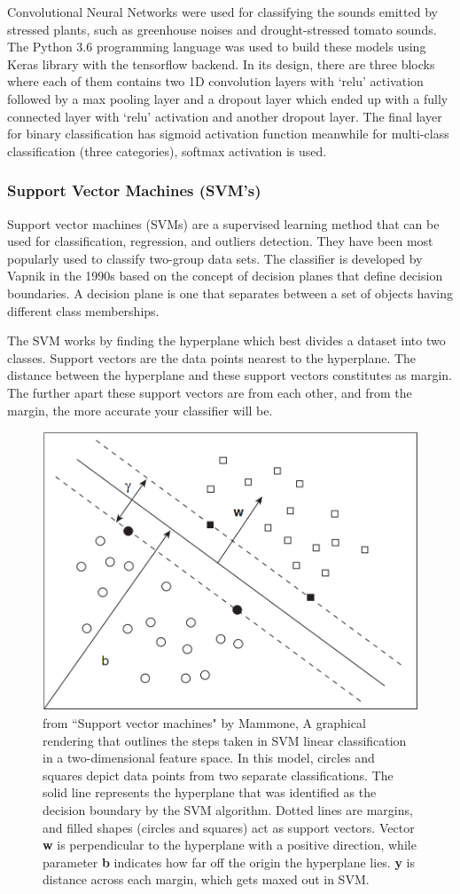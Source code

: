 Convolutional Neural Networks were used for classifying the sounds emitted by stressed plants, such as greenhouse noises and drought-stressed tomato sounds. The Python 3.6 programming language was used to build these models using Keras library with the tensorflow backend. In its design, there are three blocks where each of them contains two 1D convolution layers with ‘relu’ activation followed by a max pooling layer and a dropout layer which ended up with a fully connected layer with ‘relu’ activation and another dropout layer. The final layer for binary classification has sigmoid activation function meanwhile for multi-class classification (three categories), softmax activation is used. \cite{Cell_Sounds_emitted_by_plants}

\subsubsection{Support Vector Machines (SVM's)}
Support vector machines (SVMs) are a supervised learning method that can be used for classification, regression, and outliers detection. They have been most popularly used to classify two-group data sets. The classifier is developed by Vapnik in the 1990s based on the concept of decision planes that define decision boundaries. A decision plane is one that separates between a set of objects having different class memberships.

The SVM works by finding the hyperplane which best divides a dataset into two classes. Support vectors are the data points nearest to the hyperplane. The distance between the hyperplane and these support vectors constitutes as margin. The further apart these support vectors are from each other, and from the margin, the more accurate your classifier will be.

\begin{figure}
    \centering
    \includegraphics[width=0.5\linewidth]{images/svm.png}
    \caption{from ``Support vector machines" by Mammone\cite{mammone_support_2009}, A graphical rendering that outlines the steps taken in SVM linear classification in a two-dimensional feature space. In this model, circles and squares depict data points from two separate classifications. The solid line represents the hyperplane that was identified as the decision boundary by the SVM algorithm. Dotted lines are margins, and filled shapes (circles and squares) act as support vectors. Vector \textbf{w} is perpendicular to the hyperplane with a positive direction, while parameter \textbf{b} indicates how far off the origin the hyperplane lies. \textbf{y} is distance across each margin, which gets maxed out in SVM.}
    \label{fig:enter-label}
\end{figure}

